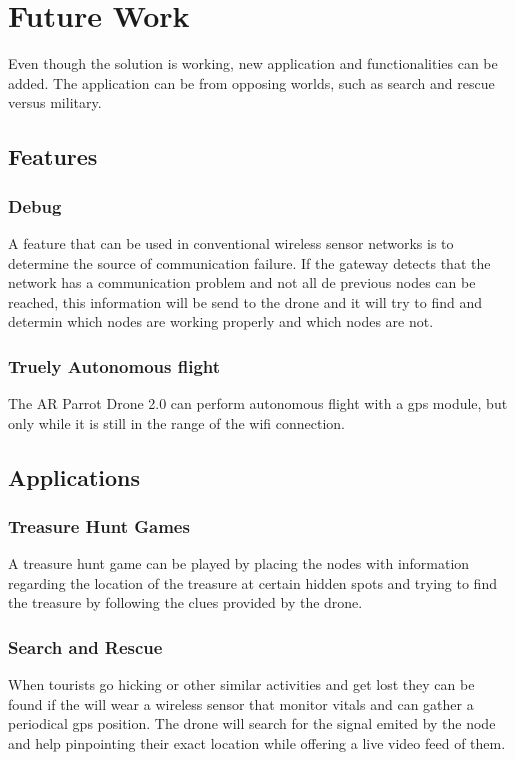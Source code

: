 \normalfont\normalsize
\chapter{Future Work}

Even though the solution is working, new application and functionalities can be added. The application can be from opposing worlds, such as search and rescue versus military.


\section{Features}

\subsection{Debug}

A feature that can be used in conventional wireless sensor networks is to determine the source of communication failure. If the gateway detects that the network has a communication problem and not all de previous nodes can be reached, this information will be send to the drone and it will try to find and determin which nodes are working properly and which nodes are not.

\subsection{Truely Autonomous flight}
The AR Parrot Drone 2.0 can perform autonomous flight with a gps module, but only while it is still in the range of the wifi connection.

\section{Applications}

\subsection{Treasure Hunt Games}
A treasure hunt game can be played by placing the nodes with information regarding the location of the treasure at certain hidden spots and trying to find the treasure by following the clues provided by the drone.

\subsection{Search and Rescue}
When tourists go hicking or other similar activities and get lost they can be found if the will wear a wireless sensor that monitor vitals and can gather a periodical gps position. The drone will search for the signal emited by the node and help pinpointing their exact location while offering a live video feed of them.

\clearpage
 
